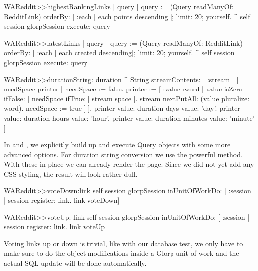 \documentclass[a4paper,10pt,twoside]{book}
\begin{document}
\begin{code}{}
WAReddit>>highestRankingLinks
   | query | 
   query := (Query readManyOf: RedditLink)
              orderBy: [ :each | each points descending ]; limit: 20; yourself.
   ^ self session glorpSession execute: query
\end{code}

\begin{code}{}
WAReddit>>latestLinks
   | query | 
   query := (Query readManyOf: RedditLink)
              orderBy: [ :each | each created descending]; limit: 20; yourself.
   ^ self session glorpSession execute: query
\end{code}

\begin{code}{}
WAReddit>>durationString: duration
   ^ String streamContents: [ :stream | 
          | needSpace printer | 
          needSpace := false. 
          printer := [ :value :word |
                         value isZero ifFalse: [ 
                              needSpace ifTrue: [ stream space ]. 
                              stream nextPutAll: (value pluralize: word). 
                              needSpace := true ] ].
          printer value: duration days value: 'day'. 
          printer value: duration hours value: 'hour'. 
          printer value: duration minutes value: 'minute' ]
\end{code}

In  and , we explicitly build up and execute Query objects with some more advanced options. For duration string conversion we use the powerful  method. With these in place we can already render the page. Since we did not yet add any CSS styling, the result will look rather dull.

\begin{code}{}
WAReddit>>voteDown:link
    self session glorpSession
              inUnitOfWorkDo: [ :session | session register: link. 
                            link voteDown]
\end{code}



\begin{code}{}
WAReddit>>voteUp: link
   self session glorpSession 
      inUnitOfWorkDo: [ :session |
                         session register: link. 
                         link voteUp ]
\end{code}

Voting links up or down is trivial, like with our database test, we only have to make sure to do the object modifications inside a Glorp unit of work and the actual SQL update will be done automatically.
\end{document}
